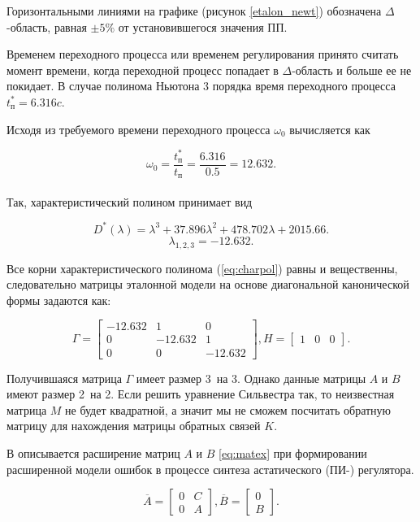 Горизонтальными линиями на графике (рисунок \ref{etalon_newt}) обозначена $\Delta$-область, равная
$\pm5\%$ от установившегося значения ПП.

Временем переходного процесса или временем регулирования принято считать момент времени, когда
переходной процесс попадает в $\Delta$-область и больше ее не покидает. В случае полинома Ньютона
3 порядка время переходного процесса $t_{\text{п}}^{\text{*}}=6.316 c$.


Исходя из требуемого времени переходного процесса $\omega_0$ вычисляется как

$$
  \omega_0=\frac{t_{\text{п}}^{\text{*}}}{t_{\text{п}}}=\frac{6.316}{0.5}=12.632.
$$\\
Так, характеристический полином принимает вид

\begin{equation}
  D^{\text{*}}(\lambda)=\lambda^3+37.896\lambda^2+478.702\lambda+2015.66.
  \label{eq:charpol}
\end{equation}
$$
  \lambda_{1,2,3}=-12.632.
$$

Все корни характеристического полинома (\ref{eq:charpol}) равны и вещественны, следовательно
матрицы эталонной модели на основе диагональной канонической формы 
задаются как:

$$
  \Gamma=\begin{bmatrix}-12.632&1&0\\0&-12.632&1\\0&0&-12.632\end{bmatrix}, H=\begin{bmatrix}1&0&0\end{bmatrix}.
$$

Получившаяся матрица $\Gamma$ имеет размер 3~на 3. Однако данные матрицы 
$A$ и $B$ имеют размер 2~на 2. Если решить уравнение Сильвестра так, то неизвестная
матрица $M$ не будет квадратной, а значит мы не сможем посчитать обратную матрицу
для нахождения матрицы обратных связей $K$.

В \cite{МодальноеУправление} описывается расширение матриц $A$ и $B$ \ref{eq:matex} при
формировании расширенной модели ошибок в процессе
синтеза астатического (ПИ-) регулятора.

\begin{equation}
  \overline{A}=\begin{bmatrix}0&C\\0&A\end{bmatrix}, \overline{B}=\begin{bmatrix}0\\B\end{bmatrix}.
  \label{eq:matex}
\end{equation}

